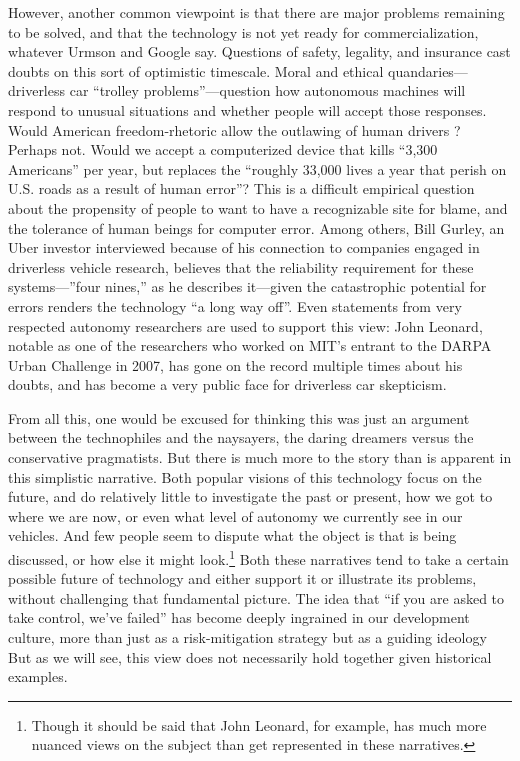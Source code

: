 However, another common viewpoint is that there are major problems remaining to be
solved, and that the technology is not yet ready for
commercialization, whatever Urmson and Google 
say. Questions of safety, legality, and insurance cast doubts on this
sort of optimistic timescale. Moral and ethical
quandaries---driverless car ``trolley problems''---question how
autonomous machines will respond to unusual situations and whether
people will accept those responses. Would American freedom-rhetoric
allow the outlawing of human drivers \cite{???-http://www.washingtonpost.com/blogs/wonkblog/wp/2015/03/18/should-we-outlaw-human-drivers-in-a-world-of-driverless-cars/}? 
Perhaps not. Would we accept a computerized device that kills ``3,300
Americans'' per year, but replaces the ``roughly 33,000 lives a year
that perish on U.S. roads as a result of human
error''\cite{???-http://www.washingtonpost.com/blogs/innovations/wp/2015/03/16/driverless-cars-a-tremendous-innovation-with-a-glaring-achilles-heel/}?
This is a difficult empirical question about the propensity of people
to want to have a recognizable site for blame, and the tolerance of
human beings for computer error. Among others, Bill Gurley, an Uber
investor interviewed because of his connection to companies engaged in
driverless vehicle research, believes that the reliability requirement
for these systems---''four nines,'' as he describes it---given the
catastrophic potential for errors renders the technology ``a long way
off''\cite{???--http://www.businessinsider.com/bill-gurley-is-skeptical-of-driverless-cars-2015-3}.
Even statements from very respected autonomy researchers are used to
support this view: John Leonard, notable as one of the researchers who
worked on MIT's entrant to the DARPA Urban Challenge in 2007, has gone
on the record multiple times about his doubts, and has become a very
public face for driverless car skepticism\cite{???-gomes}.

From all this, one would be excused for thinking this was just an
argument between the technophiles and the naysayers, the daring dreamers versus the
conservative pragmatists. But there is much more to the story than is
apparent in this simplistic narrative. Both popular visions of this
technology focus on the future, and do relatively little to
investigate the past or present, how we got to 
where we are now, or even what level of autonomy we currently see in
our vehicles. And few people seem to dispute what the object is that is
being discussed, or how else it might look.\footnote{Though it should
  be said that John Leonard, for example, has much more nuanced views
  on the subject than get represented in these narratives.} Both these narratives 
tend to take a certain possible future of technology and either support it
or illustrate its problems, without challenging that fundamental
picture. The idea that ``if you are asked to take control, we've
failed'' has become deeply ingrained in our development
culture, more than just as a risk-mitigation strategy but as a guiding
ideology But as we will see, this view does not necessarily hold together given
historical examples.


